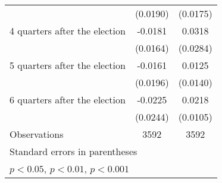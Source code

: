 \begin{table}[htbp]
\begin{tabular}{l*{2}{c}}
                    &    (0.0190)         &    (0.0175)         \\
[1em]
 4 quarters after the election&     -0.0181         &      0.0318         \\
                    &    (0.0164)         &    (0.0284)         \\
[1em]
 5 quarters after the election&     -0.0161         &      0.0125         \\
                    &    (0.0196)         &    (0.0140)         \\
[1em]
 6 quarters after the election&     -0.0225         &      0.0218\sym{*}  \\
                    &    (0.0244)         &    (0.0105)         \\
\hline
Observations        &        3592         &        3592         \\
\hline\hline
\multicolumn{3}{l}{\footnotesize Standard errors in parentheses}\\
\multicolumn{3}{l}{\footnotesize \sym{*} \(p<0.05\), \sym{**} \(p<0.01\), \sym{***} \(p<0.001\)}\\
\end{tabular}
\end{table}
